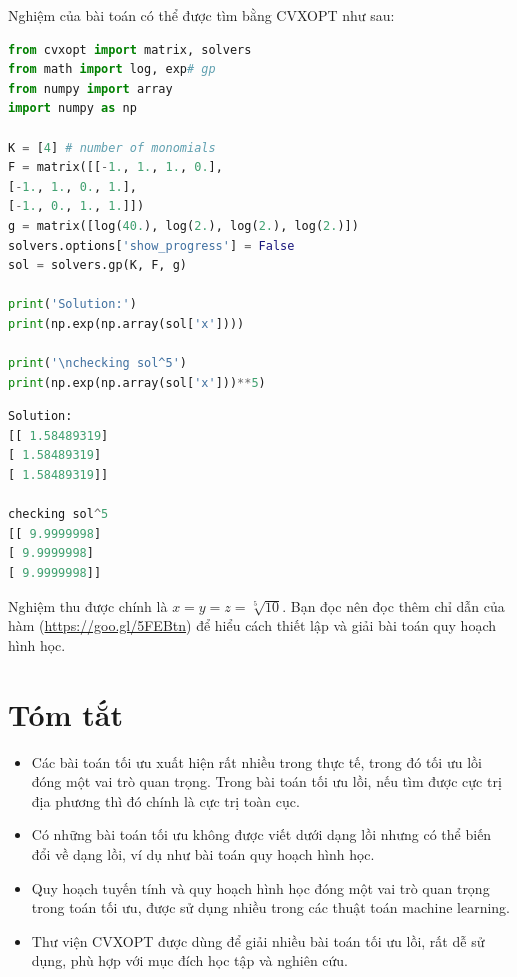 Nghiệm của bài toán có thể được tìm bằng CVXOPT như sau:
\begin{lstlisting}[language=Python]
from cvxopt import matrix, solvers
from math import log, exp# gp
from numpy import array
import numpy as np

K = [4] # number of monomials
F = matrix([[-1., 1., 1., 0.],
[-1., 1., 0., 1.],
[-1., 0., 1., 1.]])
g = matrix([log(40.), log(2.), log(2.), log(2.)])
solvers.options['show_progress'] = False
sol = solvers.gp(K, F, g)

print('Solution:')
print(np.exp(np.array(sol['x'])))

print('\nchecking sol^5')
print(np.exp(np.array(sol['x']))**5)
\end{lstlisting}
\kq
\begin{lstlisting}[language=Python]
Solution:
[[ 1.58489319]
[ 1.58489319]
[ 1.58489319]]

checking sol^5
[[ 9.9999998]
[ 9.9999998]
[ 9.9999998]]
\end{lstlisting}

Nghiệm thu được chính là $x = y = z = \sqrt[5]{10}$. Bạn đọc nên
đọc thêm chỉ dẫn của hàm  (\url{https://goo.gl/5FEBtn})
để hiểu cách thiết lập và giải bài toán quy hoạch hình học.


\section{Tóm tắt}
\begin{itemize}
\item Các bài toán tối ưu xuất hiện rất nhiều trong thực tế, trong đó tối ưu
lồi đóng một vai trò quan trọng. Trong bài toán tối ưu lồi, nếu tìm được cực
trị địa phương thì đó chính là cực trị toàn cục.

\item Có những bài toán tối ưu không được viết dưới dạng lồi nhưng có thể
biến đổi về dạng lồi, ví dụ như bài toán quy hoạch hình học.

\item Quy hoạch tuyến tính và quy hoạch hình học đóng một vai trò quan
trọng trong toán tối ưu, được sử dụng nhiều trong các thuật toán machine
learning.

\item Thư viện CVXOPT được dùng để giải nhiều bài toán tối ưu lồi, rất dễ
sử dụng, phù hợp với mục đích học tập và nghiên cứu.

\end{itemize}


